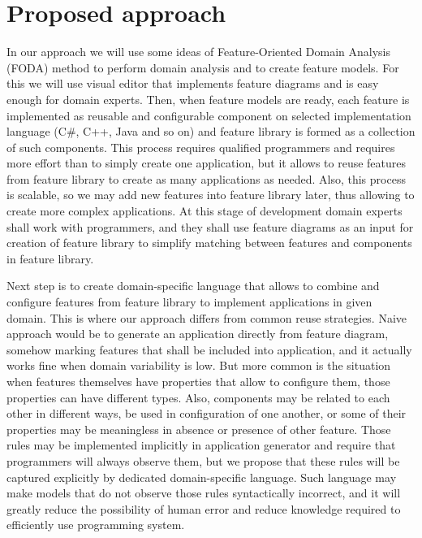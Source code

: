 \documentclass[conference]{IEEEtran}
\begin{document}
\section{Proposed approach}
\label{chapter:proposed}
In our approach we will use some ideas of Feature-Oriented Domain Analysis (FODA) method to perform domain analysis and to create feature models. For this we will use visual editor that implements feature diagrams and is easy enough for domain experts. Then, when feature models are ready, each feature is implemented as reusable and configurable component on selected implementation language (C\#, C++, Java and so on) and feature library is formed as a collection of such components. This process requires qualified programmers and requires more effort than to simply create one application, but it allows to reuse features from feature library to create as many applications as needed. Also, this process is scalable, so we may add new features into feature library later, thus allowing to create more complex applications. At this stage of development domain experts shall work with programmers, and they shall use feature diagrams as an input for creation of feature library to simplify matching between features and components in feature library.

Next step is to create domain-specific language that allows to combine and configure features from feature library to implement applications in given domain. This is where our approach differs from common reuse strategies. Naive approach would be to generate an application directly from feature diagram, somehow marking features that shall be included into application, and it actually works fine when domain variability is low. But more common is the situation when features themselves have properties that allow to configure them, those properties can have different types. Also, components may be related to each other in different ways, be used in configuration of one another, or some of their properties may be meaningless in absence or presence of other feature. Those rules may be implemented implicitly in application generator and require that programmers will always observe them, but we propose that these rules will be captured explicitly by dedicated domain-specific language. Such language may make models that do not observe those rules syntactically incorrect, and it will greatly reduce the possibility of human error and reduce knowledge required to efficiently use programming system.
\end{document}
